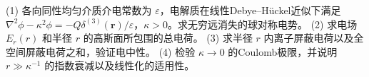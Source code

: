 (1) 各向同性均匀介质介电常数为 \(\varepsilon\)，电解质在线性Debye–Hückel近似下满足 \(\nabla^2\phi-\kappa^2\phi=-Q\delta^{(3)}(\mathbf r)/\varepsilon\)，\(\kappa>0\)。求无穷远消失的球对称电势。
(2) 求电场 \(E_r(r)\) 和半径 \(r\) 的高斯面所包围的总电荷。
(3) 求半径 \(r\) 内离子屏蔽电荷以及全空间屏蔽电荷之和，验证电中性。
(4) 检验 \(\kappa\to0\) 的Coulomb极限，并说明 \(r\gg\kappa^{-1}\) 的指数衰减以及线性化的适用性。
